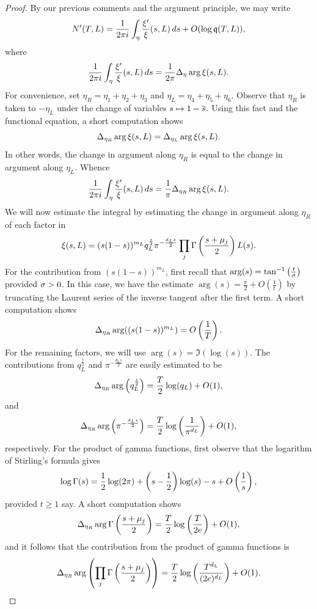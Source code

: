 \begin{proof}
      By our previous comments and the argument principle, we may write
      \[
        N'(T,L) = \frac{1}{2\pi i}\int_{\eta}\frac{\xi'}{\xi}(s,L)\,ds+O(\log{\mathfrak{q}(T,L)}),
      \]
      where
      \[
        \frac{1}{2\pi i}\int_{\eta}\frac{\xi'}{\xi}(s,L)\,ds = \frac{1}{2\pi}\Delta_{\eta}\arg\xi(s,L).
      \]
      For convenience, set \(\eta_{R} = \eta_{1}+\eta_{2}+\eta_{3}\) and \(\eta_{L} = \eta_{4}+\eta_{5}+\eta_{6}\). Observe that \(\eta_{R}\) is taken to \(-\eta_{L}\) under the change of variables \(s \mapsto 1-\overline{s}\). Using this fact and the functional equation, a short computation shows 
      \[
        \Delta_{\eta_{R}}\arg\xi(s,L) = \Delta_{\eta_{L}}\arg\xi(s,L).
      \]
      In other words, the change in argument along \(\eta_{R}\) is equal to the change in argument along \(\eta_{L}\). Whence
      \[
        \frac{1}{2\pi i}\int_{\eta}\frac{\xi'}{\xi}(s,L)\,ds = \frac{1}{\pi}\Delta_{\eta_{R}}\arg\xi(s,L).
      \]
      We will now estimate the integral by estimating the change in argument along \(\eta_{R}\) of each factor in
      \[
        \xi(s,L) = (s(1-s))^{m_{L}}q_{L}^{\frac{s}{2}}\pi^{-\frac{d_{L}s}{2}}\prod_{j}\Gamma\left(\frac{s+\mu_{j}}{2}\right)L(s).
      \]
      For the contribution from \((s(1-s))^{m_{L}}\), first recall that \(\arg(s) = \tan^{-1}\left(\frac{t}{\sigma}\right)\) provided \(\sigma > 0\). In this case, we have the estimate \(\arg(s) = \frac{\pi}{2}+O\left(\frac{1}{t}\right)\) by truncating the Laurent series of the inverse tangent after the first term. A short computation shows
      \[
        \Delta_{\eta_{R}}\arg((s(1-s))^{m_{L}}) = O\left(\frac{1}{T}\right).
      \]
      For the remaining factors, we will use \(\arg(s) = \Im(\log(s))\). The contributions from \(q_{L}^{\frac{s}{2}}\) and \(\pi^{-\frac{d_{L}s}{2}}\) are easily estimated to be
      \[
        \Delta_{\eta_{R}}\arg\left(q_{L}^{\frac{s}{2}}\right) = \frac{T}{2}\log(q_{L})+O(1),
      \]
      and
      \[
        \Delta_{\eta_{R}}\arg\left(\pi^{-\frac{d_{L}s}{2}}\right) = \frac{T}{2}\log\left(\frac{1}{\pi^{d_{L}}}\right)+O(1),
      \]
      respectively. For the product of gamma functions, first observe that the logarithm of Stirling's formula gives
      \[
        \log\Gamma(s) = \frac{1}{2}\log(2\pi)+\left(s-\frac{1}{2}\right)\log(s)-s+O\left(\frac{1}{s}\right),
      \]
      provided \(t \ge 1\) say. A short computation shows
      \[
        \Delta_{\eta_{R}}\arg\Gamma\left(\frac{s+\mu_{j}}{2}\right) = \frac{T}{2}\log\left(\frac{T}{2e}\right)+O(1),
      \]
      and it follows that the contribution from the product of gamma functions is
      \[
        \Delta_{\eta_{R}}\arg\left(\prod_{j}\Gamma\left(\frac{s+\mu_{j}}{2}\right)\right) = \frac{T}{2}\log\left(\frac{T^{d_{L}}}{(2e)^{d_{L}}}\right)+O(1).
\]
\end{proof}
